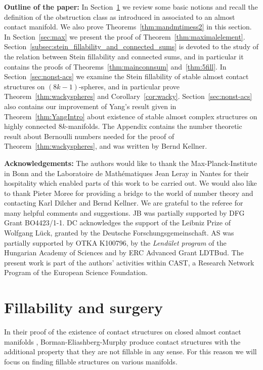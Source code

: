 \documentclass[12pt]{amsart}
\theoremstyle{remark}
\begin{document}
{\bf {Outline of the paper:}} In Section~\ref{sec:fillability}
we review some basic notions and recall the definition of the
obstruction class as introduced in \cite{BCS2} associated to an almost contact
manifold. We also prove
Theorems~\ref{thm:mandmtimess2} in this section.  In
Section~\ref{sec:max} we present the proof
of Theorem~\ref{thm:maximalelement}.
Section~\ref{subsec:stein_fillability_and_connected_sums} is devoted
to the study of the relation between Stein fillability and connected
sums, and in particular it contains the proofs of
Theorems~\ref{thm:mainconnsum} and~\ref{thm:5fill}.  In
Section~\ref{sec:nonst-acs} we examine the Stein fillability of stable almost
contact structures on $(8k{-}1)$-spheres, and in particular prove
Theorem~\ref{thm:wackyspheres} and Corollary~\ref{cor:wacky}. 
Section~\ref{sec:nonst-acs} also contains our improvement 
of Yang's result given in Theorem~\ref{thm:YangIntro}
about existence of stable almost complex structures on
highly connected $8k$-manifolds.
The
Appendix contains the number theoretic
result about Bernoulli numbers needed for the proof of
Theorem~\ref{thm:wackyspheres}, and was written by Bernd Kellner.

\bigskip

{\bf {Acknowledgements:}} The authors would like to thank the
Max-Planck-Institute in Bonn and the Laboratoire de Math\'{e}matiques Jean Leray in Nantes
for their hospitality which enabled parts of this work to be carried out.  
We would also like to thank 
Pieter Moree for providing a bridge to the world of number theory
and contacting Karl Dilcher and Bernd Kellner. 
We are grateful to the referee for many helpful comments and suggestions.
JB was partially supported by DFG Grant BO4423/1-1.
DC acknowledges the support  of the Leibniz 
Prize of Wolfgang L\"{u}ck, granted by the Deutsche Forschungsgemeinschaft.
AS was partially supported by OTKA
K100796, by the \emph{Lend\"ulet program} of the Hungarian Academy of
Sciences and by ERC Advanced Grant LDTBud.    
The present work is part of the authors' activities within CAST, a Research Network Program of the European
Science Foundation.





\section{Fillability and surgery} 
\label{sec:fillability}
In their proof of the existence of contact structures on closed almost contact manifolds
\cite{BEM}, Borman{-}Eliashberg-Murphy produce contact structures with the
additional property that they are not fillable in any sense. For this reason we will focus
on finding fillable structures on various manifolds.
\end{document}
